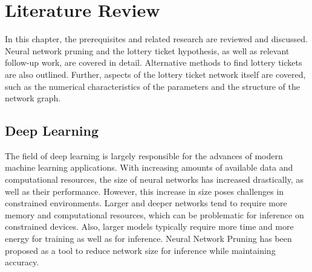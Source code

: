 \chapter{Literature Review}
In this chapter, the prerequisites and related research are reviewed and discussed.
Neural network pruning and the lottery ticket hypothesis, as well as relevant follow-up work, are covered in detail.
Alternative methods to find lottery tickets are also outlined.
Further, aspects of the lottery ticket network itself are covered, such as the numerical characteristics of the parameters and the structure of the network graph.

\section{Deep Learning}
The field of deep learning is largely responsible for the advances of modern machine learning applications.
With increasing amounts of available data and computational resources, the size of neural networks has increased drastically, as well as their performance.
However, this increase in size poses challenges in constrained environments.
Larger and deeper networks tend to require more memory and computational resources, which can be problematic for inference on constrained devices.
Also, larger models typically require more time and more energy for training as well as for inference.
Neural Network Pruning \autocite{LeCun, OptimalBrainSurgeon, HanEtAl15, PruningFiltersForEfficientConvets} has been proposed as a tool to reduce network size for inference while maintaining accuracy.

